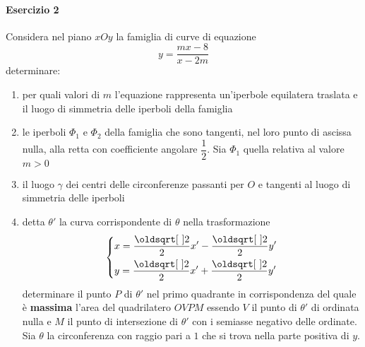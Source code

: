 \paragraph{Esercizio 2}
Considera nel piano $xOy$ la famiglia di curve di equazione
\begin{equation*}
  y=\frac{mx-8}{x-2m}
\end{equation*}
determinare:
\begin{enumerate}
  \item per quali valori di $m$ l'equazione rappresenta un'iperbole equilatera traslata e il luogo
    di simmetria delle iperboli della famiglia \label{enum:ex:aff:2:1}
  \item le iperboli $\Phi_1$ e $\Phi_2$ della famiglia che sono tangenti, nel loro punto di ascissa
    nulla, alla retta con coefficiente angolare $\dfrac{1}{2}$. Sia $\Phi_1$ quella relativa al valore
    $m>0$ \label{enum:ex:aff:2:2}
  \item il luogo $\gamma$ dei centri delle circonferenze passanti per $O$ e tangenti al luogo
    di simmetria delle iperboli \label{enum:ex:aff:2:3}
  \item detta $\theta'$ la curva corrispondente di $\theta$ nella trasformazione
    \label{enum:ex:aff:2:4}
    \begin{equation*}
      \begin{dcases}
        x = \frac{\sqrt{2}}{2}x'-\frac{\sqrt{2}}{2}y'\\
        y = \frac{\sqrt{2}}{2}x'+\frac{\sqrt{2}}{2}y'
      \end{dcases}
    \end{equation*}
    determinare il punto $P$ di $\theta'$ nel primo quadrante in corrispondenza del quale è 
    \textbf{massima} l'area del quadrilatero $OVPM$ essendo $V$ il punto di $\theta'$ di ordinata
    nulla e $M$ il punto di intersezione di $\theta'$ con i semiasse negativo delle ordinate.
    Sia $\theta$ la circonferenza con raggio pari a $1$ che si trova nella parte positiva di $y$.
\end{enumerate}
\divisor

